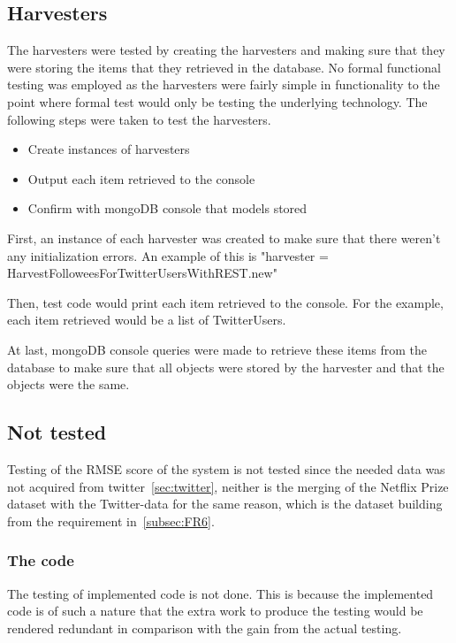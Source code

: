 \subsection{Harvesters}
The harvesters were tested by creating the harvesters and making sure that they were storing the items that they retrieved in the database. No formal functional testing was employed as the harvesters were fairly simple in functionality to the point where formal test would only be testing the underlying technology. The following steps were taken to test the harvesters.

	\begin{itemize}
	\item Create instances of harvesters
	\item Output each item retrieved to the console
	\item Confirm with mongoDB console that models stored
	\end{itemize}

First, an instance of each harvester was created to make sure that there weren't any initialization errors. An example of this is "harvester = HarvestFolloweesForTwitterUsersWithREST.new"

Then, test code would print each item retrieved to the console. For the example, each item retrieved would be a list of TwitterUsers.

At last, mongoDB console queries were made to retrieve these items from the database to make sure that all objects were stored by the harvester and that the objects were the same.

\subsection{Not tested}
Testing of the RMSE score of the system is not tested since the needed data was not acquired from twitter~\ref{sec:twitter}, neither is the merging of the Netflix Prize dataset with the Twitter-data for the same reason, which is the dataset building from the requirement in~\ref{subsec:FR6}.

\subsubsection{The code}
The testing of implemented code is not done. This is because the implemented code is of such a nature that the extra work to produce the testing would be rendered redundant in comparison with the gain from the actual testing.

